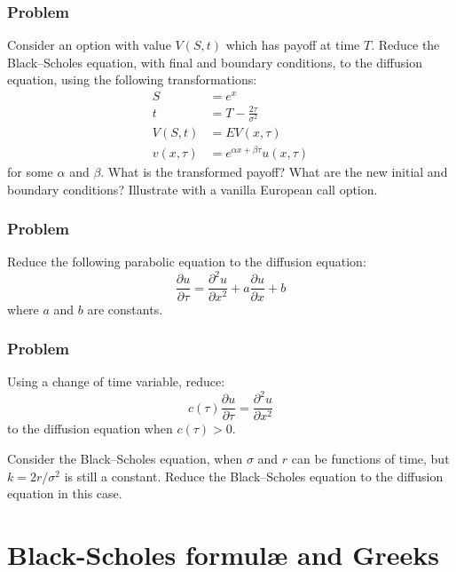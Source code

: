 \subsubsection{Problem}
Consider an option with value $V(S, t)$ which has payoff at time $T$. Reduce the Black–Scholes equation, with final and boundary conditions, to the diffusion equation, using the following transformations:
\begin{align*}
    S         &= e^{x}                               \\
    t         &= T - \frac{2\tau}{\sigma^2}          \\
    V(S,t)    &= EV(x,\tau)                          \\
    v(x,\tau) &= e^{\alpha x + \beta \tau} u(x,\tau)
\end{align*}
for some $\alpha$ and $\beta$. What is the transformed payoff? What are the new initial and boundary conditions? Illustrate with a vanilla European call option.


\subsubsection{Problem}
Reduce the following parabolic equation to the diffusion equation:
\begin{equation}
    \frac{\partial u}{\partial \tau} = \frac{\partial^2 u}{\partial x^2} + a \frac{\partial u}{\partial x} + b
\end{equation}
where $a$ and $b$ are constants. 


\subsubsection{Problem}
Using a change of time variable, reduce:
\begin{equation}
    c(\tau) \frac{\partial u}{\partial \tau} = \frac{\partial^2 u}{\partial x^2}
\end{equation}
to the diffusion equation when $c(\tau) > 0$.

Consider the Black–Scholes equation, when $\sigma$ and $r$ can be functions of time, but $k = 2r/\sigma^2$ is still a constant. Reduce the Black–Scholes equation to the diffusion equation in this case.



\section{Black-Scholes formul{\ae} and Greeks}

